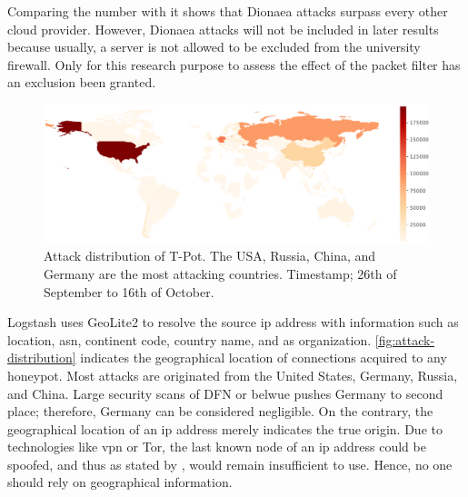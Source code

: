Comparing the number with \citet{Kelly2021} it shows that Dionaea attacks surpass every other cloud provider.
However, Dionaea attacks will not be included in later results because usually, a server is not allowed to be excluded from the university firewall.
Only for this research purpose to assess the effect of the packet filter has an exclusion been granted.

\begin{figure}
    \centering
    \includegraphics[width=\textwidth]{figures/tpot-overview-map.pdf}
    \caption[Attack distribution of T-Pot]{
        Attack distribution of T-Pot.
        The USA, Russia, China, and Germany are the most attacking countries.
        Timestamp; 26th of September to 16th of October.
    }
    \label{fig:attack-distribution}
\end{figure}

Logstash uses GeoLite2 to resolve the source \ac{ip} address with information such as location, \ac{asn}, continent code, country name, and \ac{as} organization.
\autoref{fig:attack-distribution} indicates the geographical location of connections acquired to any honeypot.
Most attacks are originated from the United States, Germany, Russia, and China.
Large security scans of DFN or \ac{belwue} pushes Germany to second place; therefore, Germany can be considered negligible.
On the contrary, the geographical location of an \ac{ip} address merely indicates the true origin.
Due to technologies like \ac{vpn} or Tor, the last known node of an \ac{ip} address could be spoofed, and thus as stated by \citet{Kelly2021}, would remain insufficient to use.
Hence, no one should rely on geographical information.

